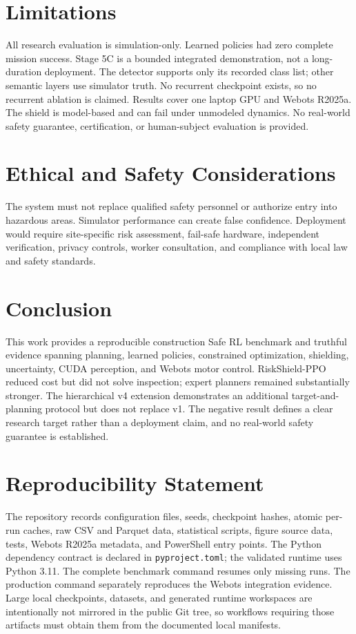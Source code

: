 \documentclass[conference]{IEEEtran}
\begin{document}
\section{Limitations}
All research evaluation is simulation-only. Learned policies had zero complete
mission success. Stage 5C is a bounded integrated demonstration, not a
long-duration deployment. The detector supports only its recorded class list;
other semantic layers use simulator truth. No recurrent checkpoint exists, so
no recurrent ablation is claimed. Results cover one laptop GPU and Webots
R2025a. The shield is model-based and can fail under unmodeled dynamics. No
real-world safety guarantee, certification, or human-subject evaluation is
provided.

\section{Ethical and Safety Considerations}
The system must not replace qualified safety personnel or authorize entry into
hazardous areas. Simulator performance can create false confidence. Deployment
would require site-specific risk assessment, fail-safe hardware, independent
verification, privacy controls, worker consultation, and compliance with local
law and safety standards.

\section{Conclusion}
This work provides a reproducible construction Safe RL benchmark and truthful
evidence spanning planning, learned policies, constrained optimization,
shielding, uncertainty, CUDA perception, and Webots motor control.
RiskShield-PPO reduced cost but did not solve inspection; expert planners
remained substantially stronger. The hierarchical v4 extension demonstrates
an additional target-and-planning protocol but does not replace v1. The
negative result defines a clear research target rather than a deployment claim,
and no real-world safety guarantee is established.

\section*{Reproducibility Statement}
The repository records configuration files, seeds, checkpoint hashes, atomic
per-run caches, raw CSV and Parquet data, statistical scripts, figure source
data, tests, Webots R2025a metadata, and PowerShell entry points. The Python
dependency contract is declared in \texttt{pyproject.toml}; the validated
runtime uses Python 3.11. The complete benchmark command resumes only missing
runs. The production command separately reproduces the Webots integration
evidence. Large local checkpoints, datasets, and generated runtime workspaces
are intentionally not mirrored in the public Git tree, so workflows requiring
those artifacts must obtain them from the documented local manifests.



\end{document}
